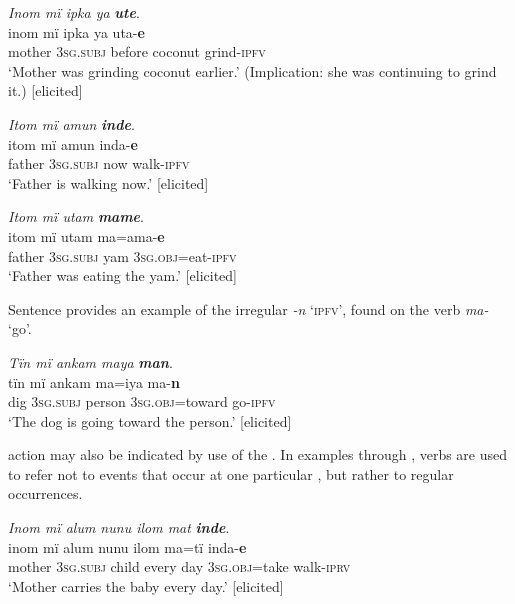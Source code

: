 \ea%
    \label{ex:verbs:21}
          \textit{Inom mï ipka ya} \textbf{\textit{ute}}.\\
\gll inom  mï      ipka  ya      uta-\textbf{e}\\
    mother  3\textsc{sg.subj}  before  coconut  grind-\textsc{ipfv}\\
\glt `Mother was grinding coconut earlier.’ (Implication: she was continuing to grind it.) [elicited]
\z

\ea%
    \label{ex:verbs:22}
          \textit{Itom mï amun} \textbf{\textit{inde}}.\\
\gll itom  mï      amun  inda-\textbf{e}\\
    father  3\textsc{sg.subj}  now  walk-\textsc{ipfv}\\
\glt `Father is walking now.’ [elicited]
\z

\ea%
    \label{ex:verbs:23}
          \textit{Itom mï utam} \textbf{\textit{mame}}.\\
\gll itom  mï      utam  ma=ama-\textbf{e}\\
    father  3\textsc{sg.subj}  yam  3\textsc{sg.obj}=eat-\textsc{ipfv}\\
\glt `Father was eating the yam.’ [elicited]
\z

Sentence  provides an example of the irregular   \textit{{}-n} ‘\textsc{ipfv}’, found on the verb \textit{ma-} ‘go’.

\ea%
    \label{ex:verbs:24}
          \textit{Tïn mï ankam maya} \textbf{\textit{man}}.\\
\gll tïn  mï      ankam  ma=iya      ma-\textbf{n}\\
    dig  3\textsc{sg.subj}  person  \textsc{3sg.obj}=toward  go{}-\textsc{ipfv}\\
\glt `The dog is going toward the person.’ [elicited]
\z

 action may also be indicated by use of the  . In examples  through ,  verbs are used to refer not to events that occur at one particular , but rather to regular occurrences.

\ea%
    \label{ex:verbs:25}
          \textit{Inom mï alum nunu ilom mat} \textbf{\textit{inde}}.\\
\gll inom  mï      alum  nunu  ilom  ma=tï      inda-\textbf{e}\\
    mother  3\textsc{sg.subj}  child  every  day    3\textsc{sg.obj=}take  walk-\textsc{iprv}\\
\glt `Mother carries the baby every day.’ [elicited]
\z

